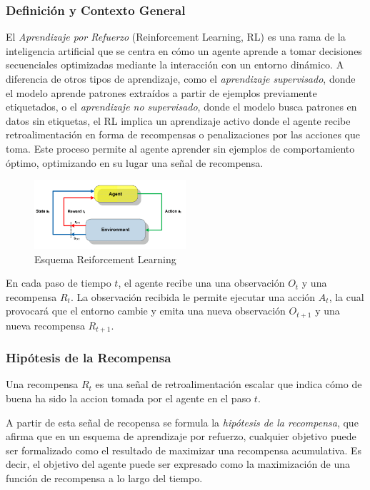 \documentclass[a4paper,12pt, twoside]{report}
\begin{document}
\subsubsection{Definición y Contexto General}

El \textit{Aprendizaje por Refuerzo} (Reinforcement Learning, RL) es una rama de la inteligencia 
artificial que se centra en cómo un agente aprende a tomar decisiones secuenciales optimizadas 
mediante la interacción con un entorno dinámico. A diferencia de otros tipos de aprendizaje, como 
el \textit{aprendizaje supervisado}, donde el modelo aprende patrones extraídos a partir de ejemplos 
previamente etiquetados, o el \textit{aprendizaje no supervisado}, donde el modelo busca patrones 
en datos sin etiquetas, el RL implica un aprendizaje activo donde el agente recibe retroalimentación 
en forma de recompensas o penalizaciones por las acciones que toma. Este proceso permite al 
agente aprender sin ejemplos de comportamiento óptimo, optimizando en su lugar una señal de recompensa.

\begin{figure}[H]
    \centering
    \includegraphics[width=0.5\textwidth]{./figures/A-brief-schema-of-Reinforcement-Learning-26.png}
    \caption{Esquema Reiforcement Learning}
    \label{fig:RF-schema}
\end{figure}

En cada paso de tiempo \(t\), el agente recibe una una observación \(O_t\) y una recompensa \(R_t\).
La observación recibida le permite ejecutar una acción \(A_t\), la cual provocará que el entorno cambie
y emita una nueva observación \(O_{t+1}\) y una nueva recompensa \(R_{t+1}\).

\subsubsection{Hipótesis de la Recompensa}

Una recompensa \(R_t\) es una señal de retroalimentación escalar que indica cómo de buena ha sido la accion 
tomada por el agente en el paso \(t\). 

A partir de esta señal de recopensa se formula
la \textit{hipótesis de la recompensa}, que afirma que en un esquema de aprendizaje por refuerzo, cualquier 
objetivo puede ser formalizado como el resultado de maximizar una recompensa acumulativa. Es decir, el objetivo del agente puede ser expresado como la maximización de una función de recompensa a lo 
largo del tiempo.
\end{document}
